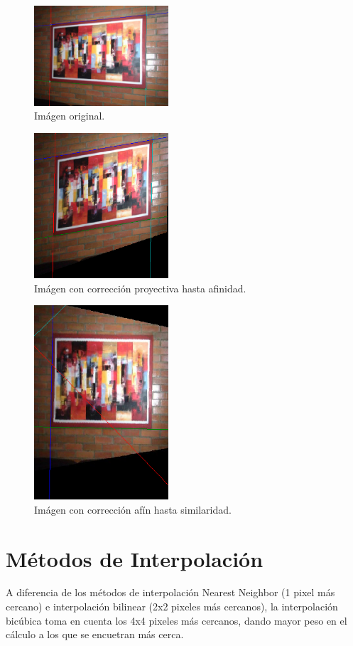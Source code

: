 \documentclass{IEEEtran}
\begin{document}
\begin{figure}
\centering
\includegraphics[width=5cm,natwidth=451,natheight=336]{imgs/t1I.png}
\caption{Imágen original.}
\label{fig:t1I}
\end{figure}
\begin{figure}
\centering
\includegraphics[width=5cm,natwidth=333,natheight=360]{imgs/t1A.png}
\caption{Imágen con corrección proyectiva hasta afinidad.}
\label{fig:t1A}
\end{figure}
\begin{figure}
\centering
\includegraphics[width=5cm,natwidth=264,natheight=381]{imgs/t1S.png}
\caption{Imágen con corrección afín hasta similaridad.}
\label{fig:t1S}
\end{figure}

\section{Métodos de Interpolación}
\label{sc:interp}
A diferencia de los métodos de interpolación Nearest Neighbor (1 pixel más cercano) e interpolación bilinear (2x2 pixeles más cercanos), la interpolación bicúbica toma en cuenta los 4x4 pixeles más cercanos, dando mayor peso en el cálculo a los que se encuetran más cerca.
\end{document}
